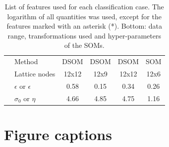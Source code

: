 \documentclass[utf8]{frontiersSCNS} %
\begin{document}
\begin{table}
\begin{tabular}{@{}rlcccc@{}}
		 \midrule
		 & Method &  DSOM & DSOM & DSOM & SOM \\
		 & Lattice nodes &  12x12 &  12x9 & 12x12 & 12x6 \\
		 & $\epsilon$ or $\epsilon$ &  0.58 & 0.15 & 0.34 & 0.26 \\
		 & $\sigma_0$ or $\eta$ & 4.66 & 4.85 & 4.75 & 1.16 \\
		\bottomrule
	\end{tabular}
	\caption{List of features used for each classification case. The logarithm of all quantities was used, except for the features marked with an asterisk (*). Bottom: data range, transformations used and hyper-parameters of the SOMs.}
	\label{tab:features}
\end{table}

\section*{Figure captions}


\end{document}
